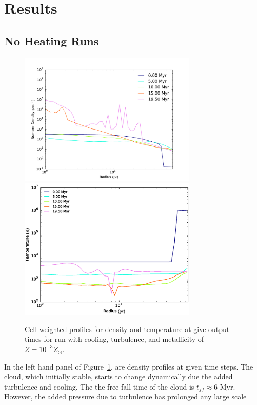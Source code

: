 \documentclass[useAMS,usenatbib]{mn2e}
\begin{document}
% 
\section{Results}
\label{sec:results}
\subsection{No Heating Runs}
\begin{figure}
\begin{center}
\includegraphics[width=8.5cm]{Images/density_series-eps-converted-to}
\includegraphics[width=8.5cm]{Images/temperature_series}
\end{center}
\caption{\label{fig:profile_turbulence}} Cell weighted profiles for density
and temperature at give output times for run with cooling, turbulence, and
metallicity of $Z=10^{-3}Z_\odot$.
\end{figure}
In the left hand panel of Figure~\ref{fig:profile_turbulence}, are density profiles at given time steps.
The cloud, which initially stable, starts to change dynamically due the added
turbulence and cooling. The the free fall time of the cloud is $t_{ff}\approx 6$
Myr. However, the added pressure due to turbulence has prolonged any large scale
\end{document}
